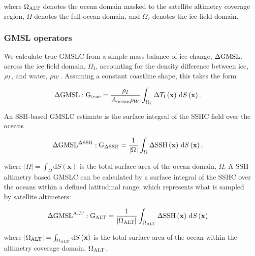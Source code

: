 where $\Omega_{\mathrm{ALT}}$ denotes the ocean domain masked to the satellite altimetry coverage region, $\Omega$ denotes the full ocean domain, and $\Omega_I$ denotes the ice field domain.


\subsubsection{GMSL operators}


We calculate true GMSLC from a simple mass balance of ice change, $\Delta \mathrm{GMSL}$, across the ice field domain, $\Omega_I$, accounting for the density difference between ice, $\rho_I$, and water, $\rho_W$. Assuming a constant coastline shape, this takes the form

\begin{equation}
    \Delta \mathrm{GMSL}: \operatorname{{G}}_{{\text{true}}} = \frac{\rho_I}{A_{\text{ocean}} \rho_W} \int_{\Omega_I} \Delta T_\text{I} \left(\mathbf{x}\right)\, \mathrm{d}S\left(\mathbf{x}\right). \label{eq:gmsl_integral}
\end{equation}

An SSH-based GMSLC estimate is the surface integral of the SSHC field over the oceans

\begin{equation}
    \Delta \mathrm{GMSL}^{\Delta \mathrm{SSH}}: \operatorname{{G}}_{{\Delta \mathrm{SSH}}} = \frac{1}{|\Omega|}\int_{\Omega} \Delta \mathrm{SSH}\left(\mathbf{x}\right)\, \mathrm{d}S\left(\mathbf{x}\right), \label{eq:gmsl_ssh_integral}
\end{equation}

where $|\Omega| = \int_{\Omega} \mathrm{d}S\left(\mathbf{x}\right)$ is the total surface area of the ocean domain, $\Omega$.
A SSH altimetry based GMSLC can be calculated by a surface integral of the SSHC over the oceans within a defined latitudinal range, which represents what is sampled by satellite altimeters:

\begin{equation}
    \Delta \mathrm{GMSL}^{\mathrm{ALT}}: \operatorname{{G}}_{{\mathrm{ALT}}} = \frac{1}{|\Omega_{\mathrm{ALT}}|}\int_{\Omega_{\mathrm{ALT}}} \Delta \mathrm{SSH}\left(\mathbf{x}\right)\, \mathrm{d}S\left(\mathbf{x}\right) \label{eq:gmsl_ssh_alt_integral}
\end{equation}

where $|\Omega_{\mathrm{ALT}}| = \int_{\Omega_{\mathrm{ALT}}} \mathrm{d}S\left(\mathbf{x}\right)$ is the total surface area of the ocean within the altimetry coverage domain, $\Omega_{\mathrm{ALT}}$.

